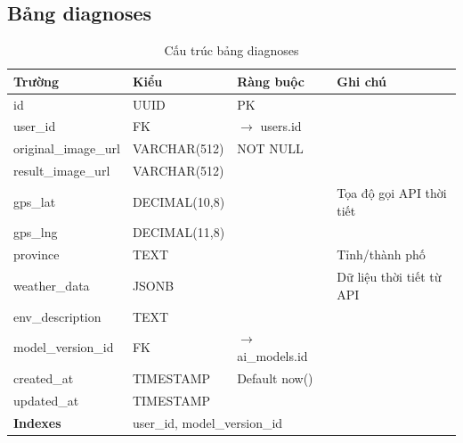 \documentclass[12pt,a4paper]{article}
\begin{document}
\subsection{Bảng diagnoses}
\begin{longtable}{|l|l|l|p{5.5cm}|}
    \caption{Cấu trúc bảng diagnoses}                                                             \\
    \hline
    \rowcolor{headerblue}
    \textbf{Trường}      & \textbf{Kiểu} & \textbf{Ràng buộc}          & \textbf{Ghi chú}         \\
    \hline
    id                   & UUID          & PK                          &                          \\
    \hline
    user\_id             & FK            & $\rightarrow$ users.id      &                          \\
    \hline
    original\_image\_url & VARCHAR(512)  & NOT NULL                    &                          \\
    \hline
    result\_image\_url   & VARCHAR(512)  &                             &                          \\
    \hline
    gps\_lat             & DECIMAL(10,8) &                             & Tọa độ gọi API thời tiết \\
    \hline
    gps\_lng             & DECIMAL(11,8) &                             &                          \\
    \hline
    province             & TEXT          &                             & Tỉnh/thành phố           \\
    \hline
    weather\_data        & JSONB         &                             & Dữ liệu thời tiết từ API \\
    \hline
    env\_description     & TEXT          &                             &                          \\
    \hline
    model\_version\_id   & FK            & $\rightarrow$ ai\_models.id &                          \\
    \hline
    created\_at          & TIMESTAMP     & Default now()               &                          \\
    \hline
    updated\_at          & TIMESTAMP     &                             &                          \\
    \hline
    \rowcolor{headerblue}
    \textbf{Indexes}     & \multicolumn{3}{l|}{user\_id, model\_version\_id}                        \\
    \hline
\end{longtable}
\end{document}
